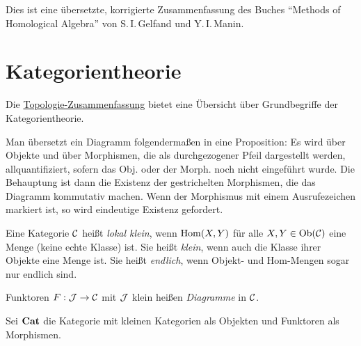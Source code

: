 \documentclass{cheat-sheet}
\begin{document}

Dies ist eine übersetzte, korrigierte Zusammenfassung des Buches "`Methods of Homological Algebra"' von S.\,I.\,Gelfand und Y.\,I.\,Manin.



\section{Kategorientheorie}

\begin{bem}
  Die \href{http://timbaumann.info/uni-spicker/topo.pdf}{Topologie-Zusammenfassung} bietet eine Übersicht über Grundbegriffe der Kategorientheorie.
\end{bem}

\begin{konv}
  Man übersetzt ein Diagramm folgendermaßen in eine Proposition:
  Es wird über Objekte und über Morphismen, die als durchgezogener Pfeil dargestellt werden, allquantifiziert, sofern das Obj. oder der Morph. noch nicht eingeführt wurde.
  Die Behauptung ist dann die Existenz der gestrichelten Morphismen, die das Diagramm kommutativ machen. Wenn der Morphismus mit einem Ausrufezeichen markiert ist, so wird eindeutige Existenz gefordert.
\end{konv}

\begin{defn}
  Eine Kategorie $\mathcal{C}$ heißt \emph{lokal klein}, wenn $\operatorname{Hom}(X, Y)$ für alle $X, Y \in \operatorname{Ob}(\mathcal{C})$ eine Menge (keine echte Klasse) ist.
  Sie heißt \emph{klein}, wenn auch die Klasse ihrer Objekte eine Menge ist.
  Sie heißt \emph{endlich}, wenn Objekt- und Hom-Mengen sogar nur endlich sind.
\end{defn}

\begin{defn}
  Funktoren $F : \mathcal{J} \to \mathcal{C}$ mit $\mathcal{J}$ klein heißen \emph{Diagramme} in $\mathcal{C}$.
\end{defn}

\begin{defn}
  Sei $\mathbf{Cat}$ die Kategorie mit kleinen Kategorien als Objekten und Funktoren als Morphismen.
\end{defn}
\end{document}

